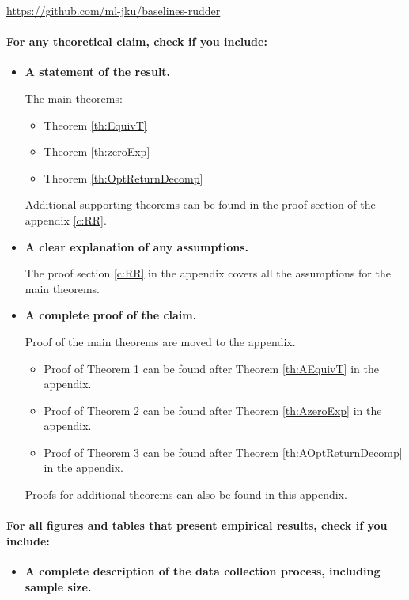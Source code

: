 \documentclass{article}
\begin{document}
\begin{appendices}
\begin{itemize}
    \href{https://github.com/ml-jku/baselines-rudder}{https://github.com/ml-jku/baselines-rudder}
\end{itemize}

\paragraph{For any theoretical claim, check if you include:}
\begin{itemize}
    \item \textbf{A statement of the result.}
    
    The main theorems:
    \begin{itemize}
        \item Theorem \ref{th:EquivT}
        \item Theorem \ref{th:zeroExp}
        \item Theorem \ref{th:OptReturnDecomp}
    \end{itemize}
    
    Additional supporting theorems can be found in the proof section of the appendix \ref{c:RR}.
    \item \textbf{A clear explanation of any assumptions.}
    
The proof section \ref{c:RR} in the appendix covers all the assumptions for the main theorems.
    \item \textbf{A complete proof of the claim.}
    
Proof of the main theorems are moved to the appendix.
\begin{itemize}
    \item Proof of Theorem 1 can be found after Theorem \ref{th:AEquivT} in the appendix. 
    \item Proof of Theorem 2 can be found after Theorem \ref{th:AzeroExp} in the appendix. 
    \item Proof of Theorem 3 can be found after Theorem \ref{th:AOptReturnDecomp} in the appendix. 
\end{itemize}
Proofs for additional theorems can also be found in this appendix.
\end{itemize}

\paragraph{For all figures and tables that present empirical results, check if you include:}
\begin{itemize}
    \item \textbf{A complete description of the data collection process, including sample size.}
    

\end{itemize}
\end{appendices}
\end{document}
